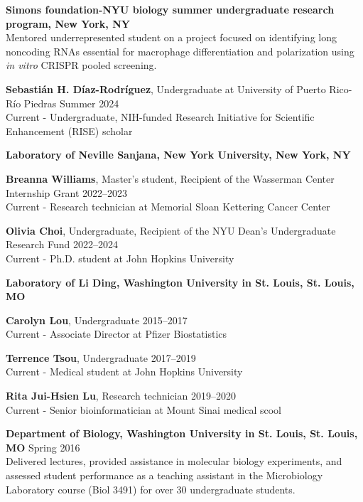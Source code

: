 \documentclass[letterpaper,11pt]{cv}
\begin{document}
\begin{entrylist}
\raggedright
\item \textbf{Simons foundation-NYU biology summer undergraduate research program, New York, NY}\\  
{\small Mentored underrepresented student on a project focused on identifying long noncoding RNAs essential for macrophage differentiation and polarization using \textit{in vitro} CRISPR pooled screening.}
\begin{detaillist}
    \item \textbf{Sebastián H. Díaz-Rodríguez}, Undergraduate at University of Puerto Rico-Río Piedras \hfill Summer 2024 \\
    Current - Undergraduate, NIH-funded Research Initiative for Scientific Enhancement (RISE) scholar
\end{detaillist}
\item \textbf{Laboratory of Neville Sanjana, New York University, New York, NY}\\
    \begin{detaillist}
       \item \textbf{Breanna Williams}, Master's student, Recipient of the Wasserman Center Internship Grant \hfill 2022--2023\\
       Current - Research technician at Memorial Sloan Kettering Cancer Center
       \item \textbf{Olivia Choi}, Undergraduate, Recipient of the NYU Dean's Undergraduate Research Fund \hfill 2022--2024\\
       Current - Ph.D. student at John Hopkins University
    \end{detaillist}
\item \textbf{Laboratory of Li Ding, Washington University in St. Louis, St. Louis, MO}\\
    \begin{detaillist}
    \item \textbf{Carolyn Lou}, Undergraduate  \hfill 2015--2017\\
    Current - Associate Director at Pfizer Biostatistics
    \item \textbf{Terrence Tsou}, Undergraduate  \hfill 2017--2019\\
    Current - Medical student at John Hopkins University
    \item \textbf{Rita Jui-Hsien Lu}, Research technician \hfill 2019--2020\\
    Current - Senior bioinformatician at Mount Sinai medical scool
    \end{detaillist}
\item \textbf{Department of Biology, Washington University in St. Louis, St. Louis, MO} \hfill Spring 2016 \\
    {\small Delivered lectures, provided assistance in molecular biology experiments, and assessed student performance as a teaching assistant in the Microbiology Laboratory course (Biol 3491) for over 30 undergraduate students.}
\end{entrylist}
\end{document}
